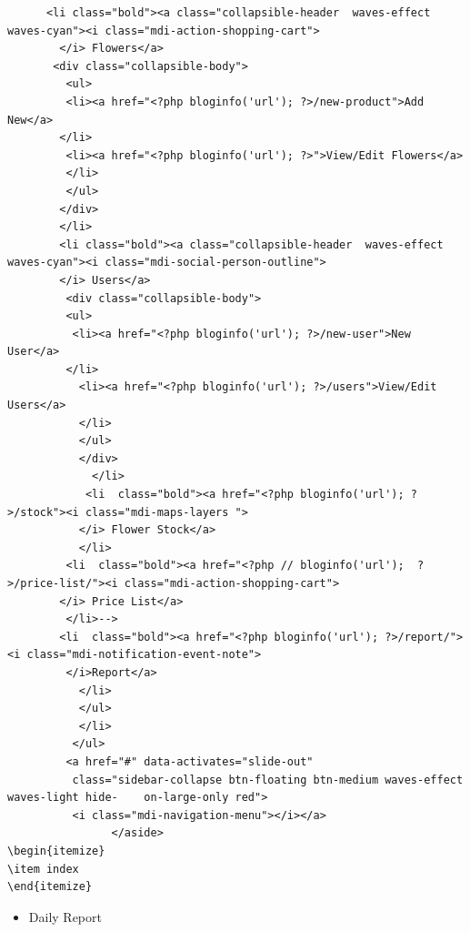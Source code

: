 \documentclass[a4paper,12pt]{article}
\begin{document}
\begin{verbatim}
      <li class="bold"><a class="collapsible-header  waves-effect waves-cyan"><i class="mdi-action-shopping-cart">
        </i> Flowers</a>
       <div class="collapsible-body">
         <ul>
         <li><a href="<?php bloginfo('url'); ?>/new-product">Add New</a>
        </li>
         <li><a href="<?php bloginfo('url'); ?>">View/Edit Flowers</a>
         </li>
         </ul>
        </div>
        </li>
        <li class="bold"><a class="collapsible-header  waves-effect waves-cyan"><i class="mdi-social-person-outline">
        </i> Users</a>
         <div class="collapsible-body">
         <ul>
          <li><a href="<?php bloginfo('url'); ?>/new-user">New User</a>
         </li>
           <li><a href="<?php bloginfo('url'); ?>/users">View/Edit Users</a>
           </li>
           </ul>
           </div>
             </li>
            <li  class="bold"><a href="<?php bloginfo('url'); ?>/stock"><i class="mdi-maps-layers ">
           </i> Flower Stock</a>
           </li>
         <li  class="bold"><a href="<?php // bloginfo('url');  ?>/price-list/"><i class="mdi-action-shopping-cart">
        </i> Price List</a>
         </li>-->
        <li  class="bold"><a href="<?php bloginfo('url'); ?>/report/"><i class="mdi-notification-event-note">
         </i>Report</a>
           </li>
           </ul>
           </li>
          </ul>
         <a href="#" data-activates="slide-out"
          class="sidebar-collapse btn-floating btn-medium waves-effect waves-light hide-    on-large-only red">
          <i class="mdi-navigation-menu"></i></a>
                </aside>
\begin{itemize} 
\item index
\end{itemize}
\end{verbatim}
\begin{itemize} 
\item Daily Report
\end{itemize}
\end{document}
